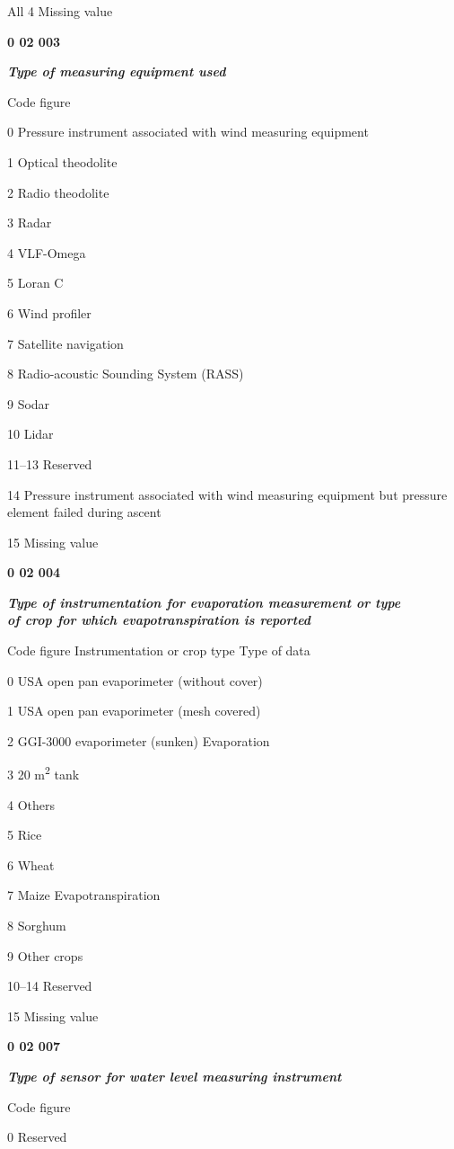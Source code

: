 All 4 Missing value

\textbf{0 02 003}

\emph{\textbf{Type of measuring equipment used}}

Code figure

0 Pressure instrument associated with wind measuring equipment

1 Optical theodolite

2 Radio theodolite

3 Radar

4 VLF-Omega

5 Loran C

6 Wind profiler

7 Satellite navigation

8 Radio-acoustic Sounding System (RASS)

9 Sodar

10 Lidar

11--13 Reserved

14 Pressure instrument associated with wind measuring equipment but pressure element failed during ascent

15 Missing value

\textbf{0 02 004}

\emph{\textbf{Type of instrumentation for evaporation measurement or type\\
of crop for which evapotranspiration is reported}}

Code figure Instrumentation or crop type Type of data

0 USA open pan evaporimeter (without cover)

1 USA open pan evaporimeter (mesh covered)

2 GGI-3000 evaporimeter (sunken) Evaporation

3 20 m\textsuperscript{2} tank

4 Others

5 Rice

6 Wheat

7 Maize Evapotranspiration

8 Sorghum

9 Other crops

10--14 Reserved

15 Missing value

\textbf{0 02 007}

\emph{\textbf{Type of sensor for water level measuring instrument}}

Code figure

0 Reserved

